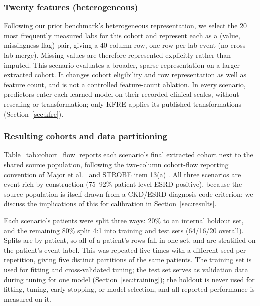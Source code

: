 \subsubsection{Twenty features (heterogeneous)}
Following our prior benchmark's heterogeneous representation, we select the 20 most frequently measured labs for this cohort and represent each as a (value, missingness-flag) pair, giving a 40-column row, one row per lab event (no cross-lab merge). Missing values are therefore represented explicitly rather than imputed. This scenario evaluates a broader, sparse representation on a larger extracted cohort. It changes cohort eligibility and row representation as well as feature count, and is not a controlled feature-count ablation. In every scenario, predictors enter each learned model on their recorded clinical scales, without rescaling or transformation; only KFRE applies its published transformations (Section~\ref{sec:kfre}).

\subsubsection{Resulting cohorts and data partitioning}
Table~\ref{tab:cohort_flow} reports each scenario's final extracted cohort next to the shared source population, following the two-column cohort-flow reporting convention of Major et al.\ \citep{major2019kfre_external_validation} and STROBE item 13(a) \citep{vonelm2007strobe}. All three scenarios are event-rich by construction (75--92\% patient-level ESRD-positive), because the source population is itself drawn from a CKD/ESRD diagnosis-code criterion; we discuss the implications of this for calibration in Section~\ref{sec:results}.

Each scenario's patients were split three ways: 20\% to an internal holdout set, and the remaining 80\% split 4:1 into training and test sets (64/16/20 overall). Splits are by patient, so all of a patient's rows fall in one set, and are stratified on the patient's event label. This was repeated five times with a different seed per repetition, giving five distinct partitions of the same patients. The training set is used for fitting and cross-validated tuning; the test set serves as validation data during tuning for one model (Section~\ref{sec:training}); the holdout is never used for fitting, tuning, early stopping, or model selection, and all reported performance is measured on it.

